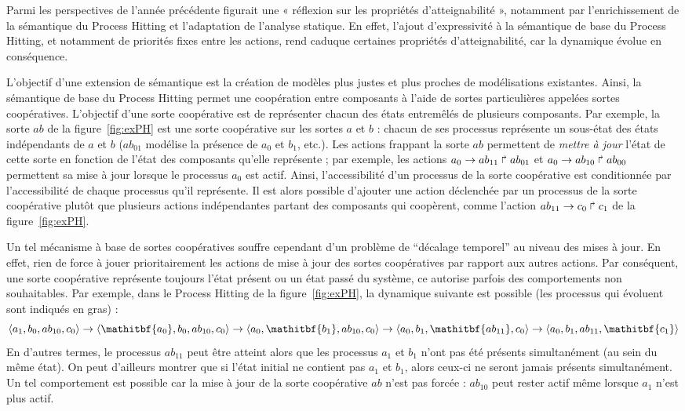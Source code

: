 Parmi les perspectives de l'année précédente figurait une « réflexion sur les propriétés d'atteignabilité », notamment par l'enrichissement de la sémantique du Process Hitting et l'adaptation de l'analyse statique.
En effet, l'ajout d'expressivité à la sémantique de base du Process Hitting, et notamment de priorités fixes entre les actions, rend caduque certaines propriétés d'atteignabilité, car la dynamique évolue en conséquence.

L'objectif d'une extension de sémantique est la création de modèles plus justes et plus proches de modélisations existantes.
Ainsi, la sémantique de base du Process Hitting permet une coopération entre composants à l'aide de sortes particulières appelées sortes coopératives.
L'objectif d'une sorte coopérative est de représenter chacun des états entremêlés de plusieurs composants.
Par exemple, la sorte $ab$ de la figure~\ref{fig:exPH} est une sorte coopérative sur les sortes $a$ et $b$ : chacun de ses processus représente un sous-état des états indépendants de $a$ et $b$ ($ab_{01}$ modélise la présence de $a_0$ et $b_1$, etc.).
Les actions frappant la sorte $ab$ permettent de \emph{mettre à jour} l'état de cette sorte en fonction de l'état des composants qu'elle représente ;
par exemple, les actions $a_0\rightarrow ab_{11}\Rsh ab_{01}$ et $a_0\rightarrow ab_{10}\Rsh ab_{00}$ permettent sa mise à jour lorsque le processus $a_0$ est actif.
Ainsi, l'accessibilité d'un processus de la sorte coopérative est conditionnée par l'accessibilité de chaque processus qu'il représente.
Il est alors possible d'ajouter une action déclenchée par un processus de la sorte coopérative plutôt que plusieurs actions indépendantes partant des composants qui coopèrent, comme l'action $ab_{11}\rightarrow c_0\Rsh c_1$ de la figure~\ref{fig:exPH}.

Un tel mécanisme à base de sortes coopératives souffre cependant d'un problème de “décalage temporel” au niveau des mises à jour.
En effet, rien de force à jouer prioritairement les actions de mise à jour des sortes coopératives par rapport aux autres actions.
Par conséquent, une sorte coopérative représente toujours l'état présent ou un état passé du système, ce autorise parfois des comportements non souhaitables.
Par exemple, dans le Process Hitting de la figure~\ref{fig:exPH}, la dynamique suivante est possible (les processus qui évoluent sont indiqués en gras) :
$$
  \PHetat{a_1, b_0, ab_{10}, c_0} \rightarrow
  \PHetat{\mathitbf{a_0}, b_0, ab_{10}, c_0} \rightarrow
  \PHetat{a_0, \mathitbf{b_1}, ab_{10}, c_0} \rightarrow
  \PHetat{a_0, b_1, \mathitbf{ab_{11}}, c_0} \rightarrow
  \PHetat{a_0, b_1, ab_{11}, \mathitbf{c_1}}
$$
En d'autres termes, le processus $ab_{11}$ peut être atteint alors que les processus $a_1$ et $b_1$ n'ont pas été présents simultanément (\ie au sein du même état).
On peut d'ailleurs montrer que si l'état initial ne contient pas $a_1$ et $b_1$, alors ceux-ci ne seront jamais présents simultanément.
Un tel comportement est possible car la mise à jour de la sorte coopérative $ab$ n'est pas forcée :
$ab_{10}$ peut rester actif même lorsque $a_1$ n'est plus actif.

